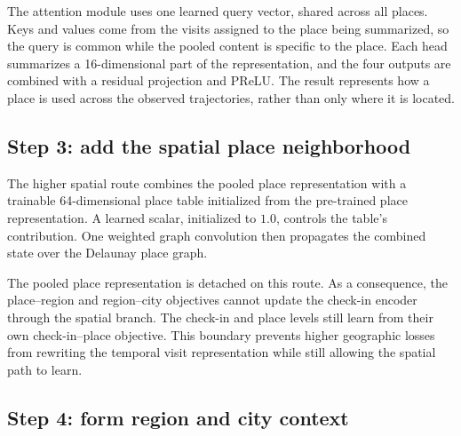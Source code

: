 The attention module uses one learned query vector, shared across all places. Keys
and values come from the visits assigned to the place being summarized, so the query
is common while the pooled content is specific to the place. Each head summarizes a 16-dimensional
part of the representation, and the four outputs are combined with a residual
projection and PReLU. The result represents how a place is used across the observed
trajectories, rather than only where it is located.

\subsection{Step 3: add the spatial place neighborhood}

The higher spatial route combines the pooled place representation with a trainable
64-dimensional place table initialized from the pre-trained place representation.
A learned scalar, initialized to $1.0$, controls the table's contribution. One
weighted graph convolution then propagates the combined state over the Delaunay
place graph.

The pooled place representation is detached on this route. As a consequence, the
place--region and region--city objectives cannot update the check-in encoder through
the spatial branch. The check-in and place levels still learn from their own
check-in--place objective. This boundary prevents higher geographic losses from
rewriting the temporal visit representation while still allowing the spatial path
to learn.

\subsection{Step 4: form region and city context}

